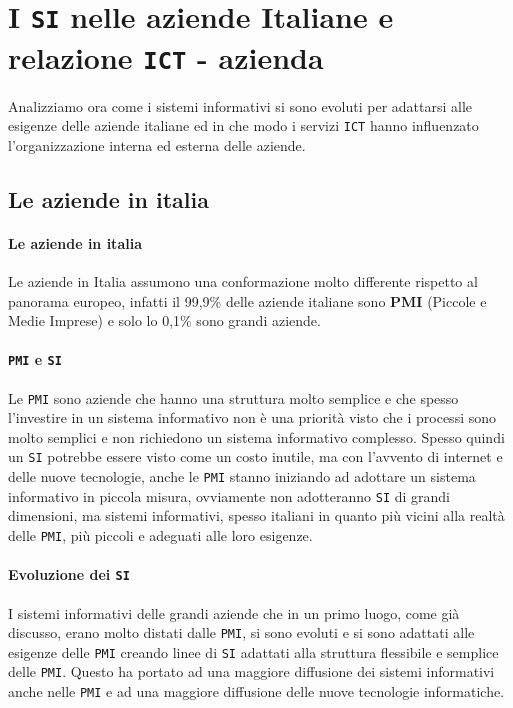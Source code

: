 \section{I \texttt{SI} nelle aziende Italiane e relazione \texttt{ICT} - azienda}
    Analizziamo ora come i sistemi informativi si sono evoluti per adattarsi alle esigenze delle aziende italiane ed in che modo i servizi \texttt{ICT} hanno influenzato l'organizzazione interna ed esterna delle aziende.
    \subsection{Le aziende in italia}
        \paragraph{Le aziende in italia} Le aziende in Italia assumono una conformazione molto differente rispetto al panorama europeo, infatti il 99,9\% delle aziende italiane sono \textbf{PMI} (Piccole e Medie Imprese) e solo lo 0,1\% sono grandi aziende.
        \paragraph{\texttt{PMI} e \texttt{SI}} 
            Le \texttt{PMI} sono aziende che hanno una struttura molto semplice e che spesso l'investire in un sistema informativo non è una priorità visto che i processi sono molto semplici e non richiedono un sistema informativo complesso. \newline
            Spesso quindi un \texttt{SI} potrebbe essere visto come un costo inutile, ma con l'avvento di internet e delle nuove tecnologie, anche le \texttt{PMI} stanno iniziando ad adottare un sistema informativo in piccola misura, ovviamente non adotteranno \texttt{SI} di grandi dimensioni, ma sistemi informativi, spesso italiani in quanto più vicini alla realtà delle \texttt{PMI}, più piccoli e adeguati alle loro esigenze.
        \paragraph{Evoluzione dei \texttt{SI}}
            I sistemi informativi delle grandi aziende che in un primo luogo, come già discusso, erano molto distati dalle \texttt{PMI}, si sono evoluti e si sono adattati alle esigenze delle \texttt{PMI} creando linee di \texttt{SI} adattati alla struttura flessibile e semplice delle \texttt{PMI}. Questo ha portato ad una maggiore diffusione dei sistemi informativi anche nelle \texttt{PMI} e ad una maggiore diffusione delle nuove tecnologie informatiche.
